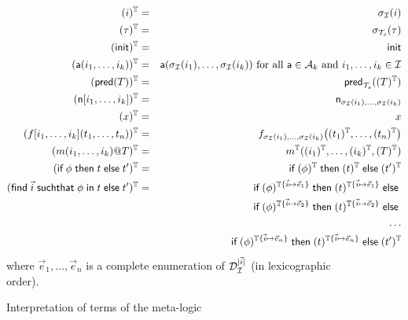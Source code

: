
\begin{figure}[t]
  \begin{eqnarray*}
    (i)^{\mathbb{T}} &=& \sigma_{\mathcal{I}}(i)
    \\
    (\tau)^{\mathbb{T}} &=& \sigma_{\mathcal{T}_s}(\tau) \\
    (\mathsf{init})^{\mathbb{T}} &=& \mathsf{init} \\
    (\textsf{a}(i_1,\ldots,i_k))^{\mathbb{T}} &=&
      \textsf{a}(\sigma_{\mathcal{I}}(i_1),\ldots,\sigma_{\mathcal{I}}(i_k))
      \text{ for all }
      \textsf{a}\in\mathcal{A}_k \text{ and } i_1,\ldots,i_k\in \mathcal{I} \\
    (\textsf{pred}(T))^{\mathbb{T}} &=&
      \mathsf{pred}_{\mathcal{T}_s}((T)^{\mathbb{T}})
    \\
    (\mathsf{n}[i_1,\ldots,i_k])^{\mathbb{T}} &=& \mathsf{n}_{\sigma_{\mathcal{I}}(i_1),\ldots,\sigma_{\mathcal{I}}(i_k)}
    \\
    (x)^{\mathbb{T}} &=& x
    \\
    (f[i_1,\ldots,i_k](t_1,\ldots,t_n))^{\mathbb{T}} &=&
    f_{\sigma_{\mathcal{I}}(i_1),\ldots,\sigma_{\mathcal{I}}(i_k)}\bigl(
      (t_1)^{\mathbb{T}},\ldots,(t_n)^{\mathbb{T}}
    \bigr)
    \\
    (m(i_1,\dots,i_k)@T)^{\mathbb{T}} &=&
    m^{\mathbb{T}}((i_1)^{\mathbb{T}},\dots,(i_k)^{\mathbb{T}},(T)^{\mathbb{T}})
    \\
    (\textsf{if}\; \phi \;\textsf{then}\; t \;\textsf{else}\; t')^{\mathbb{T}} &=&
    \textsf{if}\; (\phi)^{\mathbb{T}} \;\textsf{then}\; (t)^{\mathbb{T}} \;\textsf{else}\; (t')^{\mathbb{T}}
    \\
    (\textsf{find}\; \vec{i} \;\textsf{suchthat}\; \phi \;\textsf{in}\; t \;\textsf{else}\; t')^{\mathbb{T}} &=&
    \textsf{if}\; (\phi)^{\mathbb{T}\{\vec{i}\mapsto\vec{e}_1\}}
    \;\textsf{then}\; (t)^{\mathbb{T}\{\vec{i}\mapsto\vec{e}_1\}}
    \;\textsf{else}\; \\ & &
    \textsf{if}\; (\phi)^{\mathbb{T}\{\vec{i}\mapsto\vec{e}_2\}}
    \;\textsf{then}\; (t)^{\mathbb{T}\{\vec{i}\mapsto\vec{e}_2\}}
    \;\textsf{else}\; \\ & & \ldots \\ & &
    \textsf{if}\; (\phi)^{\mathbb{T}\{\vec{i}\mapsto\vec{e}_{n}\}}
    \;\textsf{then}\; (t)^{\mathbb{T}\{\vec{i}\mapsto\vec{e}_{n}\}}
    \;\textsf{else}\; (t')^{\mathbb{T}}
  \end{eqnarray*}
  where $\vec{e}_1, \ldots, \vec{e}_{n}$ is a complete enumeration
  of $\mathcal{D}_{\mathcal{I}}^{|\vec{i}|}$ (in lexicographic order).
  \caption{Interpretation of %
    terms of the meta-logic}
  \label{fig:interpt}
\end{figure}

